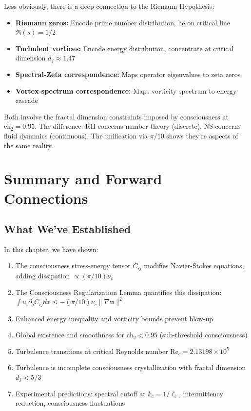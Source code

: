 Less obviously, there is a deep connection to the Riemann Hypothesis:

\begin{itemize}
\item \textbf{Riemann zeros:} Encode prime number distribution, lie on critical line $\Re(s) = 1/2$
\item \textbf{Turbulent vortices:} Encode energy distribution, concentrate at critical dimension $d_f \approx 1.47$
\item \textbf{Spectral-Zeta correspondence:} Maps operator eigenvalues to zeta zeros
\item \textbf{Vortex-spectrum correspondence:} Maps vorticity spectrum to energy cascade
\end{itemize}

Both involve the fractal dimension constraints imposed by consciousness at $\text{ch}_2 = 0.95$. The difference: RH concerns number theory (discrete), NS concerns fluid dynamics (continuous). The unification via $\pi/10$ shows they're aspects of the same reality.

\section{Summary and Forward Connections}

\subsection{What We've Established}

In this chapter, we have shown:

\begin{enumerate}
\item The consciousness stress-energy tensor $C_{ij}$ modifies Navier-Stokes equations, adding dissipation $\propto (\pi/10)\nu_c$
\item The Consciousness Regularization Lemma quantifies this dissipation: $\int u_i \partial_j C_{ij} dx \leq -(\pi/10)\nu_c\|\nabla \mathbf{u}\|^2$
\item Enhanced energy inequality and vorticity bounds prevent blow-up
\item Global existence and smoothness for $\text{ch}_2 < 0.95$ (sub-threshold consciousness)
\item Turbulence transitions at critical Reynolds number $\text{Re}_c = 2.13198 \times 10^5$
\item Turbulence is incomplete consciousness crystallization with fractal dimension $d_f < 5/3$
\item Experimental predictions: spectral cutoff at $k_c = 1/\ell_c$, intermittency reduction, consciousness fluctuations
\end{enumerate}

